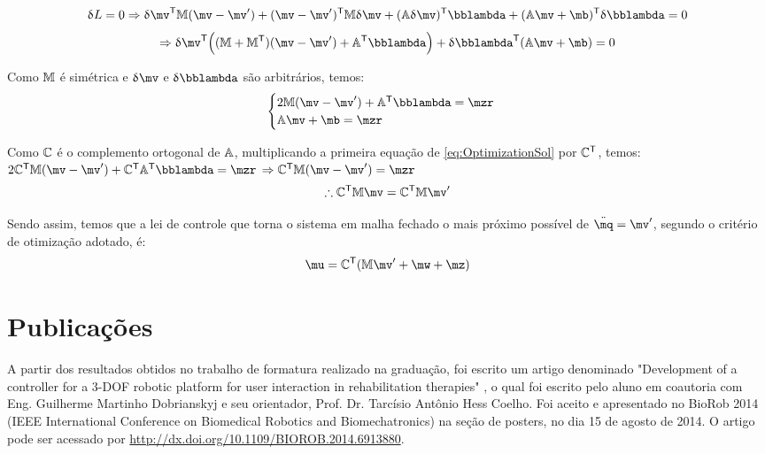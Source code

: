 \documentclass[a4paper,11pt,brazil,fleqn]{article}
\begin{document}
$$ \dl L = 0 \Rightarrow \dl \mv^\msT \mM (\mv - \mv') + (\mv - \mv')^\msT \mM \dl \mv + (\mA \dl \mv)^\msT \mlambda + (\mA \mv + \mb)^\msT \dl \mlambda = 0 $$
$$ \Rightarrow \dl \mv^\msT \Big( (\mM + \mM^\msT)(\mv - \mv') + \mA^\msT \mlambda \Big) + \dl \mlambda^\msT (\mA \mv + \mb) = 0 $$

Como $\mathbb{M}$ \'e sim\'etrica e $\dl \mv$ e $\dl \mlambda$ s\~ao arbitr\'arios, temos:
\begin{equation} \label{eq:OptimizationSol}
\begin{cases}
2 \mM (\mv - \mv') + \mA^\msT \mlambda = \mzr \\
\mA \mv + \mb = \mzr
\end{cases}
\end{equation}

Como $\mathbb{C}$ \'e o complemento ortogonal de $\mathbb{A}$, multiplicando a primeira equa\c{c}\~ao de \eqref{eq:OptimizationSol} por $\mathbb{C}^{\mathsf{T}}$, temos: \\

$ 2 \mC^\msT \mM (\mv - \mv') + \mC^\msT \mA^\msT \mlambda = \mzr $
$ \Rightarrow  \mC^\msT \mM (\mv - \mv')  = \mzr $
\begin{equation} \label{eq:OptimizationSol2}
\therefore \mC^\msT \mM \mv  = \mC^\msT \mM  \mv'
\end{equation}

Sendo assim, temos que a lei de controle que torna o sistema em malha fechado o mais pr\'oximo poss\'ivel de $\ddot{\mq} = \mv'$, segundo o crit\'erio de otimiza\c{c}\~ao adotado, \'e:
\begin{equation} \label{eq:ControlLawFinal}
\mu = \mC^\msT ( \mM \mv' + \mw + \mz )
\end{equation}

\section{Publica\c{c}\~oes}\label{S05}

A partir dos resultados obtidos no trabalho de formatura realizado na gradua\c{c}\~ao, foi escrito um artigo denominado
"Development of a controller for a 3-DOF robotic platform for user interaction in rehabilitation therapies" \cite{Andre2}, o qual foi escrito pelo aluno em coautoria com Eng. Guilherme Martinho Dobrianskyj e seu orientador, Prof. Dr. Tarc\'isio Ant\^onio Hess Coelho. Foi aceito e apresentado no BioRob 2014 (IEEE International Conference on Biomedical Robotics and Biomechatronics) na se\c{c}\~ao de posters, no dia 15 de agosto de 2014. O artigo pode ser acessado por \url{http://dx.doi.org/10.1109/BIOROB.2014.6913880}.
\end{document}
